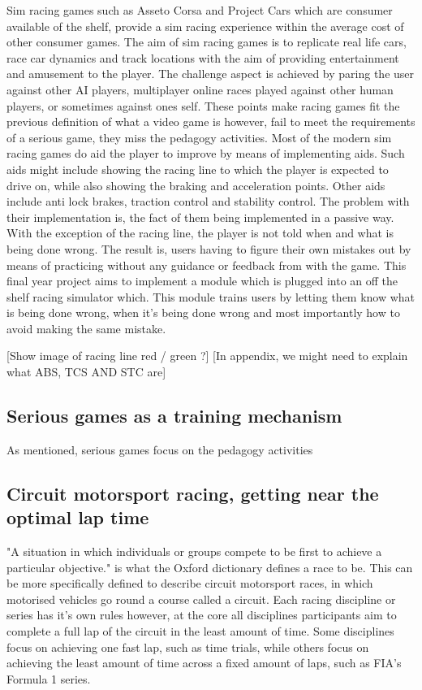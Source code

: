 \documentclass{article}
\begin{document}
Sim racing games such as Asseto Corsa and Project Cars which are consumer available of the shelf, provide a sim racing experience within the average cost of other consumer games. The aim of sim racing games is to replicate real life cars, race car dynamics and track locations with the aim of providing entertainment and amusement to the player. The challenge aspect is achieved by paring the user against other AI players, multiplayer online races played against other human players, or sometimes against ones self. These points make racing games fit the previous definition of what a video game is however, fail to meet the requirements of a serious game, they miss the pedagogy activities. Most of the modern sim racing games do aid the player to improve by means of implementing aids. Such aids might include showing the racing line to which the player is expected to drive on, while also showing the braking and acceleration points. Other aids include anti lock brakes, traction control and stability control. The problem with their implementation is, the fact of them being implemented in a passive way. With the exception of the racing line, the player is not told when and what is being done wrong. The result is, users having to figure their own mistakes out by means of practicing without any guidance or feedback from with the game. This final year project aims to implement a module which is plugged into an off the shelf racing simulator which. This module trains users by letting them know what is being done wrong, when it's being done wrong and most importantly how to avoid making the same mistake.

[Show image of racing line red / green ?]
[In appendix, we might need to explain what ABS, TCS AND STC are]

\subsection{Serious games as a training mechanism}

As mentioned, serious games focus on the pedagogy activities 

\subsection{Circuit motorsport racing, getting near the optimal lap time}

"A situation in which individuals or groups compete to be first to achieve a particular objective." is what the Oxford dictionary defines a race to be. This can be more specifically defined to describe circuit motorsport races, in which motorised vehicles go round a course called a circuit. Each racing discipline or series has it's own rules however, at the core all disciplines participants aim to complete a full lap of the circuit in the least amount of time. Some disciplines focus on achieving one fast lap, such as time trials, while others focus on achieving the least amount of time across a fixed amount of laps, such as FIA's Formula 1 series.
\end{document}

